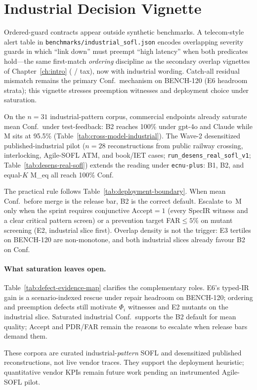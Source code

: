 
\section{Industrial Decision Vignette}
\label{sec:disc:industrial-case}

Ordered-guard contracts appear outside synthetic benchmarks.
A telecom-style alert table in \texttt{benchmarks/industrial\_sofl.json}
encodes overlapping severity guards in which ``link down'' must preempt
``high latency'' when both predicates hold---the same first-match
\emph{ordering} discipline as the secondary overlap vignettes of
Chapter~\ref{ch:intro} ( / tax), now with industrial
wording.
Catch-all residual mismatch remains the primary Conf.\ mechanism on
BENCH-120 (E6 headroom strata); this vignette stresses preemption witnesses
and deployment choice under saturation.

On the $n{=}31$ industrial-pattern corpus, commercial endpoints already
saturate mean Conf.\ under test-feedback: B2 reaches 100\% under gpt-4o and
Claude while M sits at 95.5\% (Table~\ref{tab:cross-model-industrial}).
The Wave-2 desensitized published-industrial pilot ($n{=}28$ reconstructions
from public railway crossing, interlocking, Agile-SOFL ATM, and book/IET
cases; \texttt{run\_desens\_real\_sofl\_v1}; Table~\ref{tab:desens-real-sofl})
extends the reading under \texttt{ecnu-plus}: B1, B2, and equal-$K$ M\_eq all
reach 100\% Conf.

The practical rule follows Table~\ref{tab:deployment-boundary}.
When mean Conf.\ before merge is the release bar, B2 is the correct default.
Escalate to~M only when the sprint requires conjunctive
$\mathrm{Accept}{=}1$ (every SpecIR witness and a clear critical pattern
screen) or a prevention target FAR${\le}5\%$ on mutant screening (E2,
industrial slice first).
Overlap density is not the trigger: E3 tertiles on BENCH-120 are
non-monotone, and both industrial slices already favour B2 on Conf.

\paragraph{What saturation leaves open.}
Table~\ref{tab:defect-evidence-map} clarifies the complementary roles.
E6's typed-IR gain is a scenario-indexed rescue under repair headroom on
BENCH-120; ordering and preemption defects still motivate $\Phi_i$ witnesses
and E2 mutants on the industrial slice.
Saturated industrial Conf.\ supports the B2 default for mean quality;
Accept and PDR/FAR remain the reasons to escalate when release bars demand
them.

These corpora are curated industrial-\emph{pattern} SOFL and desensitized
published reconstructions, not live vendor traces.
They support the deployment heuristic; quantitative vendor KPIs remain
future work pending an instrumented Agile-SOFL pilot.
